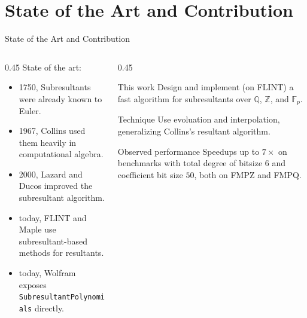 \documentclass[aspectratio=169]{beamer}
\newcommand{\Z}{\mathbb{Z}}
\newcommand{\Q}{\mathbb{Q}}
\newcommand{\Fp}{\mathbb{F}_p}
\begin{document}
\section{State of the Art and Contribution}

\begin{frame}{State of the Art and Contribution}
  \begin{columns}
    \begin{column}{0.45\textwidth}
      State of the art:
      \begin{itemize}
        \item 1750, Subresultants were already known to Euler.
        \pause
        \item 1967, Collins used them heavily in computational algebra.
        \pause
        \item 2000, Lazard and Ducos improved the subresultant algorithm.
        \pause
        \item today, FLINT and Maple use subresultant-based methods for resultants.
        \item today, Wolfram exposes \texttt{SubresultantPolynomials} directly.
      \end{itemize}
    \end{column}
    \pause
    \begin{column}{0.45\textwidth}
      \begin{block}{This work}
      Design and implement (on FLINT) a fast algorithm for subresultants over $\Q$, $\Z$, and $\Fp$.
      \end{block}
      \pause
      \begin{block}{Technique}
      Use evoluation and interpolation, generalizing Collins's resultant algorithm.
      \end{block}
      \pause
      \begin{block}{Observed performance}
      Speedups up to $7\times$ on benchmarks with total degree of bitsize $6$ and coefficient bit size $50$, both on FMPZ and FMPQ.
      \end{block}
    \end{column}
  \end{columns}
\end{frame}
\end{document}
